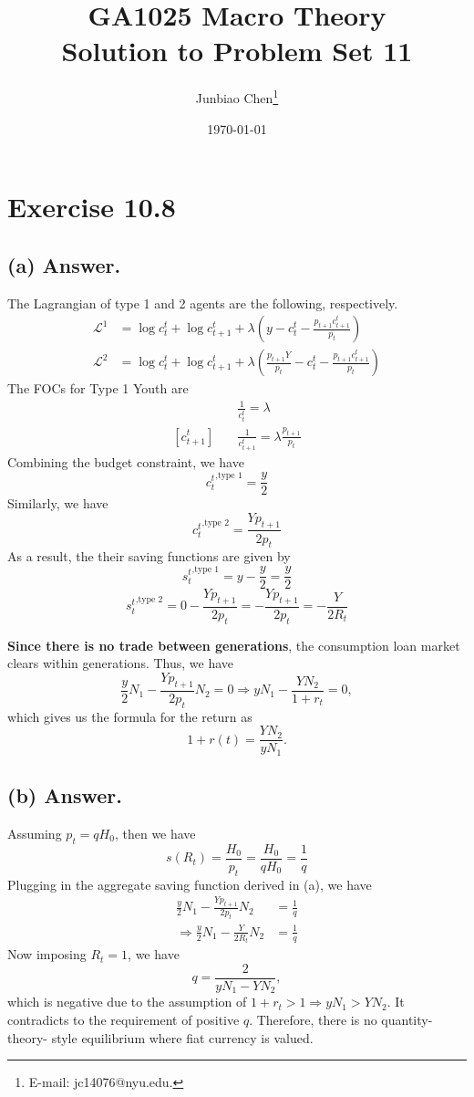 \documentclass[11pt]{article}
\title{GA1025 Macro Theory \\Solution to Problem Set 11}
\author{
Junbiao Chen\thanks{E-mail: jc14076@nyu.edu.}
}
\date{\today}
\theoremstyle{definition}
\theoremstyle{boldtitle} %
\numberwithin{equation}{section}
\numberwithin{figure}{section}
\numberwithin{table}{section}
\begin{document}
\maketitle

\section{Exercise 10.8}
\subsection{(a) Answer.}
The Lagrangian of type 1 and 2 agents are the following, respectively.
\begin{align*}
    \mathcal{L}^1 & = \log c^t_t + \log c^t_{t+1} + \lambda ( y - c^t_t - \frac{p_{t+1} c^t_{t+1}}{p_t}) \\ 
    \mathcal{L}^2 & = \log c^t_t + \log c^t_{t+1} + \lambda ( \frac{p_{t+1} Y}{p_t} - c^t_t - \frac{p_{t+1} c^t_{t+1}}{p_t})
\end{align*}
The FOCs for Type 1 Youth are 
\begin{align*}
    [c^t_t] \quad & \frac{1}{c^t_t} = \lambda \\ 
    [c^t_{t+1}] \quad & \frac{1}{c^t_{t+1}} = \lambda \frac{p_{t+1}}{p_t}
\end{align*}
Combining the budget constraint, we have 
\[
{c_t^t}^{, \text{type 1}} = \frac{y}{2}
\]
Similarly, we have 
\[
{c_t^t}^{, \text{type 2}} = \frac{Y p_{t+1}}{2 p_t}
\]
As a result, the their saving functions are given by 
\[
{s_t^t}^{, \text{type 1}} = y - \frac{y}{2} = \frac{y}{2}
\]
\[
{s_t^t}^{, \text{type 2}} = 0 - \frac{Y p_{t+1}}{2 p_t} = - \frac{Y p_{t+1}}{2 p_t} = - \frac{Y}{2 R_t}
\]

\textbf{Since there is no trade between generations}, the consumption loan market clears within generations.
Thus, we have 
\[
\frac{y}{2} N_1 - \frac{Y p_{t+1}}{2 p_t} N_2 = 0 \Rightarrow y N_1 - \frac{Y N_2}{1 + r_t} = 0,
\]
which gives us the formula for the return as 
\[
1 + r(t) = \frac{Y N_2}{y N_1}.
\]


\subsection{(b) Answer.}
Assuming $p_t = q H_0$, then we have
\[
s(R_t) = \frac{H_0}{p_t} = \frac{H_0}{q H_0} = \frac{1}{q}
\]
Plugging in the aggregate saving function derived in (a), we have 
\begin{align*}
    \frac{y}{2} N_1 - \frac{Y p_{t+1}}{2 p_t} N_2 & = \frac{1}{q} \\ 
    \Rightarrow \frac{y}{2} N_1 - \frac{Y }{2 R_t } N_2 & = \frac{1}{q}
\end{align*}
Now imposing $R_t = 1$, we have 
\[
q = \frac{2  }{yN_1 - Y N_2},
\]
which is negative due to the assumption of $1 + r_t > 1 \Rightarrow y N_1 > Y N_2$.
It contradicts to the requirement of positive $q$.
Therefore, there is no quantity-theory- style equilibrium where fiat currency is valued.
\end{document}
